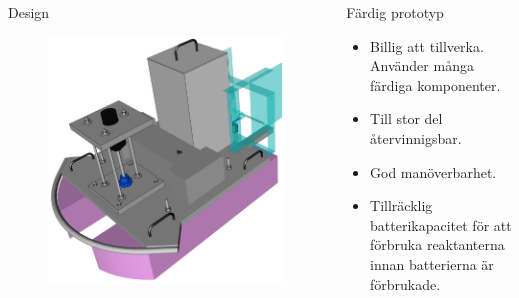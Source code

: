 \documentclass[final]{beamer}
\newlength{\onecolwid}
\begin{document}
\begin{frame}[t]
\begin{columns}[t, totalwidth=\textwidth]
\begin{column}{\onecolwid}
\begin{block}{Design}
        \vskip 6cm
        \begin{figure}[H]
          \centering
          \hbox{\hspace{-5cm}\includegraphics[width=27cm]{figures/front_box_off.png}}
        \end{figure}

      \end{block}

    \end{column}
    \begin{column}{\onecolwid}

      \begin{block}{Färdig prototyp}
        \begin{itemize}
        \item Billig att tillverka. Använder många färdiga komponenter.
        \item Till stor del återvinnigsbar.
        \item God manöverbarhet.
          \item Tillräcklig batterikapacitet för att förbruka reaktanterna innan batterierna är förbrukade.
        \end{itemize}


\end{block}
\end{column}
\end{columns}
\end{frame}
\end{document}
